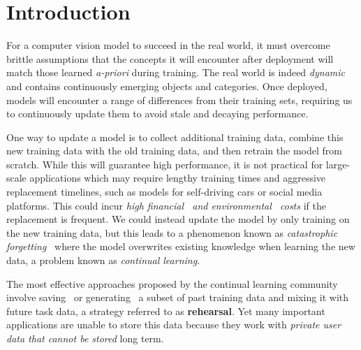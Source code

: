 \section{Introduction}
\label{sec:intro}



\vspace{-2mm}
For a computer vision model to succeed in the real world, it must overcome brittle assumptions that the concepts it will encounter after deployment will match those learned \emph{a-priori} during training. The real world is indeed \emph{dynamic} and contains continuously emerging objects and categories. Once deployed,  models will encounter a range of differences from their training sets, requiring us to continuously update them to avoid stale and decaying performance.


One way to update a model is to collect additional training data, combine this new training data with the old training data, and then retrain the model from scratch. While this will guarantee high performance, it is not practical for large-scale applications which may require lengthy training times and aggressive replacement timelines, such as models for self-driving cars or social media platforms. This could incur \emph{high financial~\cite{justus2018predicting} and environmental~\cite{lacoste2019quantifying} costs} if the replacement is frequent. We could instead update the model by only training on the new training data, but this leads to a phenomenon known as \emph{catastrophic forgetting}~\cite{nguyen2019toward} where the model overwrites existing knowledge when learning the new data, a problem known as %
\emph{continual learning}.

The most effective approaches proposed by the continual learning community involve saving~\cite{Rebuffi:2016} or generating~\cite{Shin:2017} a subset of past training data and mixing it with future task data, a strategy referred to as \textbf{rehearsal}. Yet many important applications are unable to store this data because they work with \emph{private user data that cannot be stored} long term.%

